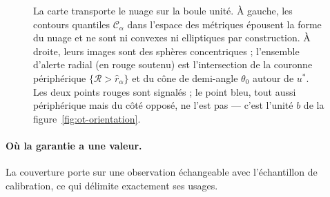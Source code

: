 \documentclass[11pt,a4paper]{article}
\theoremstyle{definition}
\theoremstyle{remark}
\begin{document}
\begin{figure}[htbp]
\vspace{0.6em}
\caption{La carte transporte le nuage sur la boule unité. À gauche, les contours quantiles
$\mathcal{C}_\alpha$ dans l'espace des métriques épousent la forme du nuage et ne sont ni
convexes ni elliptiques par construction. À droite, leurs images sont des sphères
concentriques ; l'ensemble d'alerte radial (en rouge soutenu) est l'intersection de la
couronne périphérique $\{\mathcal{R} > \hat{r}_\alpha\}$ et du cône de demi-angle
$\theta_0$ autour de $u^{*}$. Les deux points rouges sont signalés ; le point bleu, tout
aussi périphérique mais du côté opposé, ne l'est pas --- c'est l'unité $b$ de la
figure~\ref{fig:ot-orientation}.}
\label{fig:ot-alerte}
\end{figure}

\bigskip

\paragraph{Où la garantie a une valeur.} La couverture porte sur une observation
échangeable avec l'échantillon de calibration, ce qui délimite exactement ses usages.

\medskip
\end{document}
